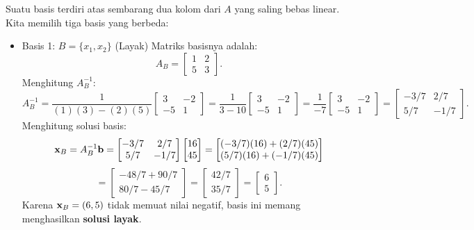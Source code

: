 Suatu basis terdiri atas sembarang dua kolom dari \( A \) yang saling bebas linear. Kita memilih tiga basis yang berbeda:
\begin{itemize}
\item  Basis 1: \(B= \{x_1, x_2\} \) (Layak)
Matriks basisnya adalah:
\[
A_B =
\begin{bmatrix}
    1 & 2 \\
    5 & 3
\end{bmatrix}.
\]
Menghitung \( A_B^{-1} \):
\[
A_B^{-1} =
\frac{1}{(1)(3) - (2)(5)}
\begin{bmatrix}
    3 & -2 \\
    -5 & 1
\end{bmatrix}
=
\frac{1}{3 - 10}
\begin{bmatrix}
    3 & -2 \\
    -5 & 1
\end{bmatrix}
=
\frac{1}{-7}
\begin{bmatrix}
    3 & -2 \\
    -5 & 1
\end{bmatrix}
=
\begin{bmatrix}
    -3/7 & 2/7 \\
    5/7 & -1/7
\end{bmatrix}.
\]
Menghitung solusi basis:
\[
\mathbf{x}_B = A_B^{-1}\mathbf{b}=
\begin{bmatrix}
    -3/7 & 2/7 \\
    5/7 & -1/7
\end{bmatrix}
\begin{bmatrix}
    16 \\ 45
\end{bmatrix}
=
\begin{bmatrix}
    (-3/7)(16) + (2/7)(45) \\
    (5/7)(16) + (-1/7)(45)
\end{bmatrix}
\]
\[
=
\begin{bmatrix}
    -48/7 + 90/7 \\
    80/7 - 45/7
\end{bmatrix}
=
\begin{bmatrix}
    42/7 \\
    35/7
\end{bmatrix}
=
\begin{bmatrix}
    6 \\ 5
\end{bmatrix}.
\]
Karena \( \mathbf{x}_B = (6,5) \) tidak memuat nilai negatif, basis ini memang menghasilkan \textbf{solusi layak}.


\end{itemize}
